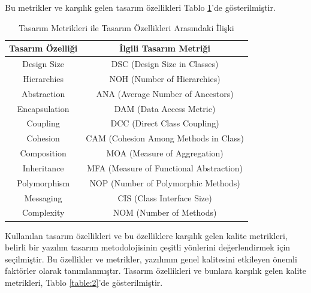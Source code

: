 \documentclass[conference]{IEEEtran}
\begin{document}
Bu metrikler ve karşılık gelen tasarım özellikleri Tablo \ref{table:1}'de gösterilmiştir.
\begin{table}[h]
	\centering
	\begin{tabular}{|c|c|}
		\hline
		\textbf{Tasarım Özelliği} & \textbf{İlgili Tasarım Metriği} \\
		\hline
		Design Size & DSC (Design Size in Classes) \\
		\hline
		Hierarchies & NOH (Number of Hierarchies) \\
		\hline
		Abstraction & ANA (Average Number of Ancestors) \\
		\hline
		Encapsulation & DAM (Data Access Metric) \\
		\hline
		Coupling & DCC (Direct Class Coupling) \\
		\hline
		Cohesion & CAM (Cohesion Among Methods in Class) \\
		\hline
		Composition & MOA (Measure of Aggregation) \\
		\hline
		Inheritance & MFA (Measure of Functional Abstraction) \\
		\hline
		Polymorphism & NOP (Number of Polymorphic Methods) \\
		\hline
		Messaging & CIS (Class Interface Size) \\
		\hline
		Complexity & NOM (Number of Methods) \\
		\hline
	\end{tabular}
	\caption{Tasarım Metrikleri ile Tasarım Özellikleri Arasındaki İlişki}
	\label{table:1}
\end{table}

Kullanılan tasarım özellikleri ve bu özelliklere karşılık gelen kalite metrikleri, belirli bir yazılım tasarım metodolojisinin çeşitli yönlerini değerlendirmek için seçilmiştir. Bu özellikler ve metrikler, yazılımın genel kalitesini etkileyen önemli faktörler olarak tanımlanmıştır. Tasarım özellikleri ve bunlara karşılık gelen kalite metrikleri, Tablo \ref{table:2}’de gösterilmiştir.
\end{document}
